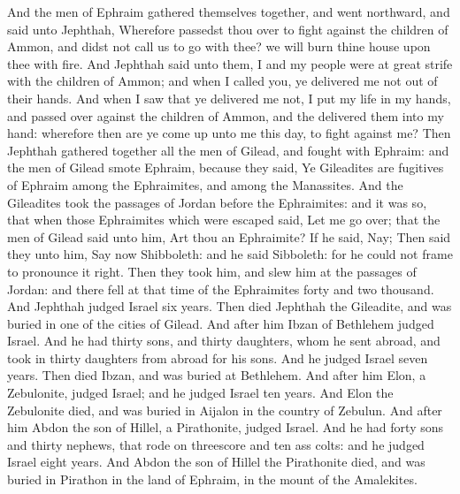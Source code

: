 \begin{biblechapter} %
 And the men of Ephraim gathered themselves together, and went northward, and said unto Jephthah, Wherefore passedst thou over to fight against the children of Ammon, and didst not call us to go with thee? we will burn thine house upon thee with fire.
\verse And Jephthah said unto them, I and my people were at great strife with the children of Ammon; and when I called you, ye delivered me not out of their hands.
\verse And when I saw that ye delivered me not, I put my life in my hands, and passed over against the children of Ammon, and the \LORD delivered them into my hand: wherefore then are ye come up unto me this day, to fight against me?
\verse Then Jephthah gathered together all the men of Gilead, and fought with Ephraim: and the men of Gilead smote Ephraim, because they said, Ye Gileadites are fugitives of Ephraim among the Ephraimites, and among the Manassites.
\verse And the Gileadites took the passages of Jordan before the Ephraimites: and it was so, that when those Ephraimites which were escaped said, Let me go over; that the men of Gilead said unto him, Art thou an Ephraimite? If he said, Nay;
\verse Then said they unto him, Say now Shibboleth: and he said Sibboleth: for he could not frame to pronounce it right. Then they took him, and slew him at the passages of Jordan: and there fell at that time of the Ephraimites forty and two thousand.
\verse And Jephthah judged Israel six years. Then died Jephthah the Gileadite, and was buried in one of the cities of Gilead.
 And after him Ibzan of Bethlehem judged Israel.
\verse And he had thirty sons, and thirty daughters, whom he sent abroad, and took in thirty daughters from abroad for his sons. And he judged Israel seven years.
\verse Then died Ibzan, and was buried at Bethlehem.
\verse And after him Elon, a Zebulonite, judged Israel; and he judged Israel ten years.
\verse And Elon the Zebulonite died, and was buried in Aijalon in the country of Zebulun.
\verse And after him Abdon the son of Hillel, a Pirathonite, judged Israel.
\verse And he had forty sons and thirty nephews, that rode on threescore and ten ass colts: and he judged Israel eight years.
\verse And Abdon the son of Hillel the Pirathonite died, and was buried in Pirathon in the land of Ephraim, in the mount of the Amalekites.
\end{biblechapter}

